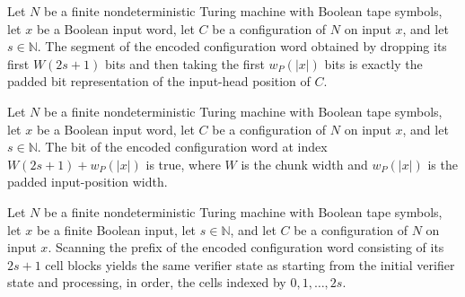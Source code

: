 \begin{lemma}
\label{Complexity.Codec.cfgWord_pos}
\leanok
{}
Let $N$ be a finite nondeterministic Turing machine with Boolean tape symbols, let $x$
be a Boolean input word, let $C$ be a configuration of $N$ on input $x$, and let
$s\in\mathbb{N}$. The segment of the encoded configuration word obtained by dropping its
first $W(2s+1)$ bits and then taking the first $w_P(|x|)$ bits is exactly the padded bit
representation of the input-head position of $C$.
\end{lemma}

\begin{lemma}
\label{Complexity.Codec.cfgWord_last}
\leanok
{}
Let $N$ be a finite nondeterministic Turing machine with Boolean tape symbols, let $x$
be a Boolean input word, let $C$ be a configuration of $N$ on input $x$, and let
$s\in\mathbb{N}$. The bit of the encoded configuration word at index $W(2s+1)+w_P(|x|)$
is true, where $W$ is the chunk width and $w_P(|x|)$ is the padded input-position width.
\end{lemma}

\begin{lemma}
\label{Complexity.Codec.vScan_cfgWord_eq}
\leanok
{}
Let $N$ be a finite nondeterministic Turing machine with Boolean tape symbols, let $x$
be a finite Boolean input, let $s\in\mathbb N$, and let $C$ be a configuration of $N$ on
input $x$. Scanning the prefix of the encoded configuration word consisting of its
$2s+1$ cell blocks yields the same verifier state as starting from the initial verifier
state and processing, in order, the cells indexed by $0,1,\ldots,2s$.
\end{lemma}

